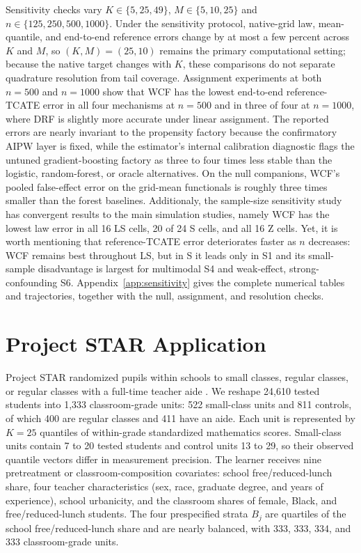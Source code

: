 \documentclass[twoside]{article}
\begin{document}
Sensitivity checks vary $K\in\{5,25,49\}$, $M\in\{5,10,25\}$ and  $n\in\{125,250,500,1000\}$. Under the sensitivity protocol, native-grid law, mean-quantile, and end-to-end reference errors change by at most a few percent across $K$ and $M$, so $(K,M)=(25,10)$ remains the primary computational setting; because the native target changes with $K$, these comparisons do not separate quadrature resolution from tail coverage. Assignment experiments at both $n=500$ and $n=1000$ show that WCF has the lowest end-to-end reference-TCATE error in all four mechanisms at $n=500$ and in three of four at $n=1000$, where DRF is slightly more accurate under linear assignment. The reported errors are nearly invariant to the propensity factory because the confirmatory AIPW layer is fixed, while the estimator's internal calibration diagnostic flags the untuned gradient-boosting factory as three to four times less stable than the logistic, random-forest, or oracle alternatives. On the null companions, WCF's pooled false-effect error on the grid-mean functionals is roughly three times smaller than the forest baselines. Additionaly, the sample-size sensitivity study has convergent results to the main simulation studies, namely WCF has the lowest law error in all 16 LS cells, 20 of 24 S cells, and all 16 Z cells. Yet, it is worth mentioning that reference-TCATE error deteriorates faster as $n$ decreases: WCF remains best throughout LS, but in S it leads only in S1 and its small-sample disadvantage is largest for multimodal S4 and weak-effect, strong-confounding S6. Appendix~\ref{app:sensitivity} gives the complete numerical tables and trajectories, together with the null, assignment, and resolution checks.

\section{Project STAR Application}\label{sec:applied}

Project STAR randomized pupils within schools to small classes, regular classes, or regular classes with a full-time teacher aide \citep{word1990state,krueger1999experimental,chetty2011kindergarten}. We reshape 24,610 tested students into 1,333 classroom-grade units: 522 small-class units and 811 controls, of which 400 are regular classes and 411 have an aide. Each unit is represented by $K=25$ quantiles of within-grade standardized mathematics scores. Small-class units contain 7 to 20 tested students and control units 13 to 29, so their observed quantile vectors differ in measurement precision. The learner receives nine pretreatment or classroom-composition covariates: school free/reduced-lunch share, four teacher characteristics (sex, race, graduate degree, and years of experience), school urbanicity, and the classroom shares of female, Black, and free/reduced-lunch students. The four prespecified strata $B_j$ are quartiles of the school free/reduced-lunch share and are nearly balanced, with 333, 333, 334, and 333 classroom-grade units.
\end{document}
